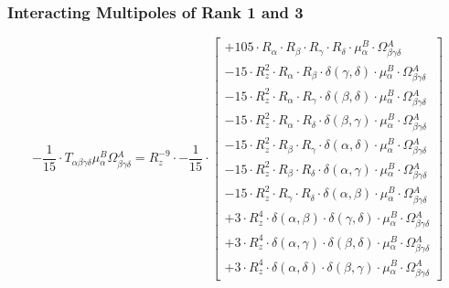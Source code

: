 \documentclass{article}
\begin{document}
\subsubsection*{Interacting Multipoles of Rank 1 and 3}
\begin{equation}
- \frac{1}{15} \cdot T_{\alpha{}\beta{}\gamma{}\delta{}} \mu{}^{B}_{\alpha{}} \Omega{}^{A}_{\beta{}\gamma{}\delta{}} = R_{z}^{-9} \cdot - \frac{1}{15} \cdot  \left[ \begin{array}{c} 
 		+ 105 \cdot R_{\alpha{}} \cdot R_{\beta{}} \cdot R_{\gamma{}} \cdot R_{\delta{}} \cdot \mu{}^{B}_{\alpha{}} \cdot \Omega{}^{A}_{\beta{}\gamma{}\delta{}} 
 \\[0.2em] 		 - 15 \cdot R_{z}^{2} \cdot R_{\alpha{}} \cdot R_{\beta{}} \cdot \delta{}\left(\gamma{}, \delta{}\right) \cdot \mu{}^{B}_{\alpha{}} \cdot \Omega{}^{A}_{\beta{}\gamma{}\delta{}} 
 \\[0.2em] 		 - 15 \cdot R_{z}^{2} \cdot R_{\alpha{}} \cdot R_{\gamma{}} \cdot \delta{}\left(\beta{}, \delta{}\right) \cdot \mu{}^{B}_{\alpha{}} \cdot \Omega{}^{A}_{\beta{}\gamma{}\delta{}} 
 \\[0.2em] 		 - 15 \cdot R_{z}^{2} \cdot R_{\alpha{}} \cdot R_{\delta{}} \cdot \delta{}\left(\beta{}, \gamma{}\right) \cdot \mu{}^{B}_{\alpha{}} \cdot \Omega{}^{A}_{\beta{}\gamma{}\delta{}} 
 \\[0.2em] 		 - 15 \cdot R_{z}^{2} \cdot R_{\beta{}} \cdot R_{\gamma{}} \cdot \delta{}\left(\alpha{}, \delta{}\right) \cdot \mu{}^{B}_{\alpha{}} \cdot \Omega{}^{A}_{\beta{}\gamma{}\delta{}} 
 \\[0.2em] 		 - 15 \cdot R_{z}^{2} \cdot R_{\beta{}} \cdot R_{\delta{}} \cdot \delta{}\left(\alpha{}, \gamma{}\right) \cdot \mu{}^{B}_{\alpha{}} \cdot \Omega{}^{A}_{\beta{}\gamma{}\delta{}} 
 \\[0.2em] 		 - 15 \cdot R_{z}^{2} \cdot R_{\gamma{}} \cdot R_{\delta{}} \cdot \delta{}\left(\alpha{}, \beta{}\right) \cdot \mu{}^{B}_{\alpha{}} \cdot \Omega{}^{A}_{\beta{}\gamma{}\delta{}} 
 \\[0.2em] 		 + 3 \cdot R_{z}^{4} \cdot \delta{}\left(\alpha{}, \beta{}\right) \cdot \delta{}\left(\gamma{}, \delta{}\right) \cdot \mu{}^{B}_{\alpha{}} \cdot \Omega{}^{A}_{\beta{}\gamma{}\delta{}} 
 \\[0.2em] 		 + 3 \cdot R_{z}^{4} \cdot \delta{}\left(\alpha{}, \gamma{}\right) \cdot \delta{}\left(\beta{}, \delta{}\right) \cdot \mu{}^{B}_{\alpha{}} \cdot \Omega{}^{A}_{\beta{}\gamma{}\delta{}} 
 \\[0.2em] 		 + 3 \cdot R_{z}^{4} \cdot \delta{}\left(\alpha{}, \delta{}\right) \cdot \delta{}\left(\beta{}, \gamma{}\right) \cdot \mu{}^{B}_{\alpha{}} \cdot \Omega{}^{A}_{\beta{}\gamma{}\delta{}}
 \end{array}\right] 
\end{equation}
\end{document}
